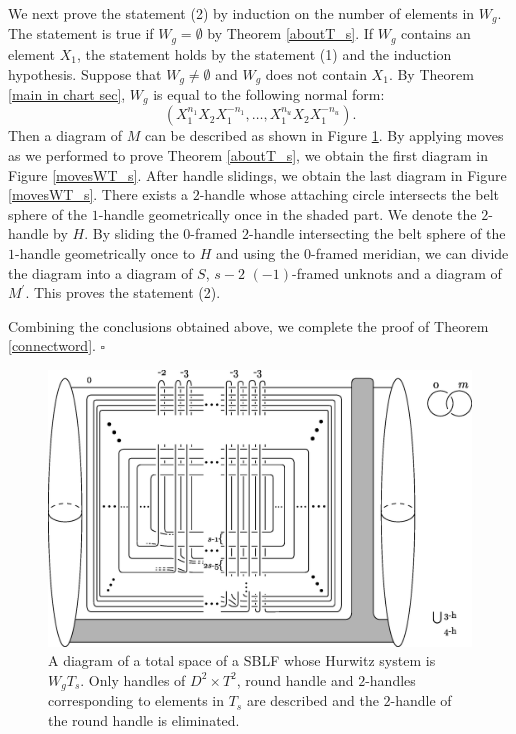 \documentclass{amsart}
\theoremstyle{plain}
\theoremstyle{definition}
\begin{document}
We next prove the statement (2) by induction on the number of elements in $W_g$. 
The statement is true if $W_g=\emptyset$ by Theorem \ref{aboutT_s}. 
If $W_g$ contains an element $X_1$, the statement holds by the statement (1) and the induction hypothesis. 
Suppose that $W_g\neq\emptyset$ and $W_g$ does not contain $X_1$. 
By Theorem \ref{main in chart sec}, $W_g$ is equal to the following normal form: 
\[
(X_1^{n_1}X_2X_1^{-n_1},\ldots,X_1^{n_u}X_2X_1^{-n_u}). 
\]
Then a diagram of $M$ can be described as shown in Figure \ref{WT_smfd}. 
By applying moves as we performed to prove Theorem \ref{aboutT_s}, we obtain the first diagram in Figure \ref{movesWT_s}. 
After handle slidings, we obtain the last diagram in Figure \ref{movesWT_s}. 
There exists a $2$-handle whose attaching circle intersects the belt sphere of the $1$-handle geometrically once in the shaded part. 
We denote the $2$-handle by $H$. 
By sliding the $0$-framed $2$-handle intersecting the belt sphere of the $1$-handle geometrically once to $H$ and using the $0$-framed meridian, 
we can divide the diagram into a diagram of $S$, $s-2$ $(-1)$-framed unknots and a diagram of $M^\prime$. 
This proves the statement (2). 

\par

Combining the conclusions obtained above, we complete the proof of Theorem \ref{connectword}. \hfill $\square$

\begin{figure}[htbp]
\begin{center}
\includegraphics[width=140mm]{WT_smfd.eps}
\end{center}
\caption{A diagram of a total space of a SBLF whose Hurwitz system is $W_gT_s$. 
Only handles of $D^2\times T^2$, round handle and $2$-handles corresponding to elements in $T_s$ are described 
and the $2$-handle of the round handle is eliminated. }
\label{WT_smfd}
\end{figure}
\end{document}
